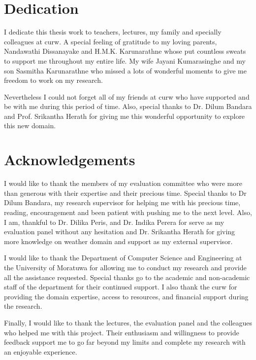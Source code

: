 \documentclass[a4paper,oneside,12pt]{report}
\begin{document}
\restoregeometry
\normalsize

\chapter*{Dedication}
I dedicate this thesis work to teachers, lectures, my family and specially colleagues at \acrfull{curw}. A special feeling of gratitude to my loving parents, Nandawathi Dissanayake and H.M.K. Karunarathne whose put countless sweats to support me throughout my entire life. My wife Jayani Kumarasinghe and my son Sasmitha Karunarathne who missed a lots of wonderful moments to give me freedom to work on my research.

Nevertheless I could not forget all of my friends at \acrshort{curw} who have supported and be with me during this period of time. Also, special thanks to Dr. Dilum Bandara and Prof. Srikantha Herath for giving me this wonderful opportunity to explore this new domain.

\chapter*{Acknowledgements}
I would like to thank the members of my evaluation committee who were more than generous with their expertise and their precious time. Special thanks to Dr Dilum Bandara, my research supervisor for helping me with his precious time, reading, encouragement and been patient with pushing me to the next level. Also, I am, thankful to Dr. Dilika Peris, and Dr. Indika Perera for serve as my evaluation panel without any hesitation and Dr. Srikantha Herath for giving more knowledge on weather domain and support as my external supervisor.

I would like to thank the Department of Computer Science and Engineering at the University of Moratuwa for allowing me to conduct my research and provide all the assistance requested. Special thanks go to the academic and non-academic staff of the department for their continued support. I also thank the \acrfull{curw} for providing the domain expertise, access to resources, and financial support during the research.

Finally, I would like to thank the lectures, the evaluation panel and the colleagues who helped me with this project. Their enthusiasm and willingness to provide feedback support me to go far beyond my limits and complete my research with an enjoyable experience.
\end{document}

